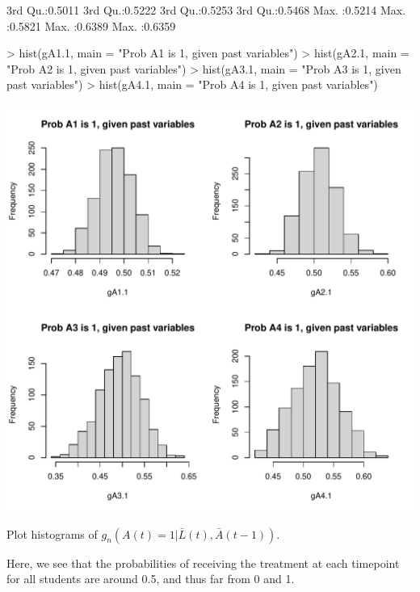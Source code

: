 \documentclass[answers]{exam}
\newenvironment{myfigure}{\captionsetup{type=mytype}}{}
\begin{document}
\begin{enumerate}
\begin{solution}
\begin{Schunk}
\begin{Soutput}
 3rd Qu.:0.5011   3rd Qu.:0.5222   3rd Qu.:0.5253   3rd Qu.:0.5468  
 Max.   :0.5214   Max.   :0.5821   Max.   :0.6389   Max.   :0.6359  
\end{Soutput}
\begin{Sinput}
> hist(gA1.1, main = "Prob A1 is 1, given past variables")
> hist(gA2.1, main = "Prob A2 is 1, given past variables")
> hist(gA3.1, main = "Prob A3 is 1, given past variables")
> hist(gA4.1, main = "Prob A4 is 1, given past variables")
\end{Sinput}
\end{Schunk}
\begin{myfigure}
\begin{center}
\includegraphics[width=.4\textwidth]{g1Hist2.pdf}
\caption{Plot histograms of $g_n(A(t) = 1|\bar{L}(t), \bar{A}(t-1))$.}
\label{Fig:g1Hist2}
\end{center}
\end{myfigure}

Here, we see that the probabilities of receiving the treatment at each timepoint for all students are around 0.5, and thus far from 0 and 1.


\end{solution}
\end{enumerate}
\end{document}
